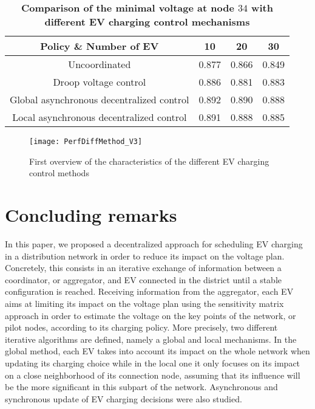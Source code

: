 \documentclass[journal]{IEEEtran}
\begin{document}
\begin{table}[h]
\caption{\textbf{Comparison of the minimal voltage at node $34$ with different EV charging control mechanisms}}
\label{tab:perfV}
\begin{center}
\begin{tabular}{|c|c|c|c|}
\hline
Policy \& Number of EV & 10 & 20 & 30 \\
 \hline
Uncoordinated &	0.877 & 0.866 & 0.849 \\
\hline
Droop voltage control &	0.886 & 0.881 & 0.883 \\
\hline
Global asynchronous decentralized control &	0.892 & 0.890 & 0.888 \\ 
\hline
Local asynchronous decentralized control & 0.891 & 0.888 & 0.885 \\
\hline
\end{tabular}
\end{center}
\end{table}

\begin{figure}[!htbp]
\centering
\texttt{[image: PerfDiffMethod\_V3]}
\caption{First overview of the characteristics of the different EV charging control methods}
\label{Fig:PerfDiffMeth}
\end{figure}

\section{Concluding remarks}


In this paper, we proposed a decentralized approach for scheduling EV charging in a distribution network in order to reduce its impact on the voltage plan. Concretely, this consists in an iterative exchange of information between a coordinator, or aggregator, and EV connected in the district until a stable configuration is reached. Receiving information from the aggregator, each EV aims at limiting its impact on the voltage plan using the sensitivity matrix approach in order to estimate the voltage on the key points of the network, or pilot nodes, according to its charging policy. More precisely, two different iterative algorithms are defined, namely a global and local mechanisms. In the global method, each EV takes into account its impact on the whole network when updating its charging choice while in the local one it only focuses on its impact on a close neighborhood of its connection node, assuming that its influence will be the more significant in this subpart of the network. Asynchronous and synchronous update of EV charging decisions were also studied. 
\end{document}
